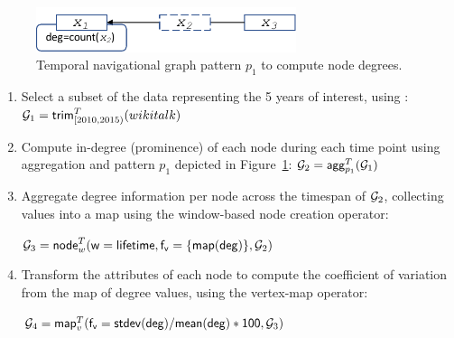 %

\begin{figure}
\centering
\includegraphics[width=3in]{figs/degrees.pdf}
\caption{Temporal navigational graph pattern $p_1$ to compute node degrees.}
\vspace{-0.2cm}
\label{fig:degrees}
\vspace{-0.2cm}
\end{figure}

\begin{enumerate}[itemindent=\dimexpr\labelwidth+\labelsep\relax,leftmargin=0pt]
\item Select a subset of the data representing the 5 years of
  interest, using :  $\mathcal{G}_1 = \textsf{trim}^T_{[2010,2015)}(wikitalk)$

\item Compute in-degree (prominence) of each node during each time
  point using aggregation and pattern $p_1$ depicted in Figure~\ref{fig:degrees}:  $\mathcal{G}_2 = \textsf{agg}^T_{p_1}(\mathcal{G}_1)$

\item Aggregate degree information per node across the timespan of
  $\mathcal{G}_2$, collecting values into a map using the window-based node
  creation operator:

$\mathcal{G}_3 =\textsf{node}^T_w(\mathsf{w=lifetime},\mathsf{f_v=\{map(deg)\}},\mathcal{G}_2)$

\item Transform the attributes of each node to compute the
  coefficient of variation from the map of degree values, using the
  vertex-map operator:

$\mathcal{G}_4 = \textsf{map}^T_v(\mathsf{f_v=stdev(deg)/mean(deg)*100}, \mathcal{G}_3)$
\end{enumerate}

